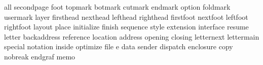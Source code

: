 \startinterface all
        {secondpage}
              {foot}
           {topmark}
           {botmark}
           {cutmark}
           {endmark}
            {option}
          {foldmark}
          {usermark}
             {layer}
         {firsthead}
          {nexthead}
          {lefthead}
         {righthead}
         {firstfoot}
          {nextfoot}
          {leftfoot}
         {rightfoot}
            {layout}
             {place}
        {initialize}
            {finish}
          {sequence}
             {style}
         {extension}
         {interface}
            {resume}
            {letter}
       {backaddress}
         {reference}
          {location}
           {address}
           {opening}
           {closing}
        {letternext}
        {lettermain}
           {special}
          {notation}
            {inside}
          {optimize}
              {file}
                 {e}
              {data}
            {sender}
          {dispatch}
         {enclosure}
              {copy}
           {nobreak}
           {endgraf}
              {memo}
